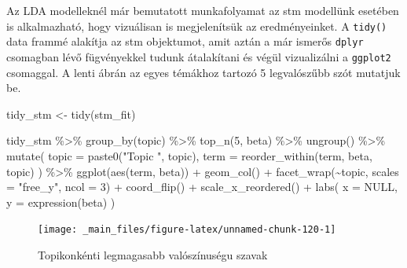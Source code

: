 \documentclass[
]{book}
\newenvironment{Shaded}{\begin{snugshade}}{\end{snugshade}}
\newcommand{\AttributeTok}[1]{\textcolor[rgb]{0.77,0.63,0.00}{#1}}
\newcommand{\ConstantTok}[1]{\textcolor[rgb]{0.00,0.00,0.00}{#1}}
\newcommand{\DecValTok}[1]{\textcolor[rgb]{0.00,0.00,0.81}{#1}}
\newcommand{\FunctionTok}[1]{\textcolor[rgb]{0.00,0.00,0.00}{#1}}
\newcommand{\NormalTok}[1]{#1}
\newcommand{\OtherTok}[1]{\textcolor[rgb]{0.56,0.35,0.01}{#1}}
\newcommand{\SpecialCharTok}[1]{\textcolor[rgb]{0.00,0.00,0.00}{#1}}
\newcommand{\StringTok}[1]{\textcolor[rgb]{0.31,0.60,0.02}{#1}}
\begin{document}
Az LDA modelleknél már bemutatott munkafolyamat az stm modellünk
esetében is alkalmazható, hogy vizuálisan is megjelenítsük az
eredményeinket. A \texttt{tidy()} data frammé alakítja az stm
objektumot, amit aztán a már ismerős \texttt{dplyr} csomagban lévő
fügvényekkel tudunk átalakítani és végül vizualizálni a \texttt{ggplot2}
csomaggal. A lenti ábrán az egyes témákhoz tartozó 5 legvalószűbb szót
mutatjuk be.

\begin{Shaded}
\begin{Highlighting}[]
\NormalTok{tidy\_stm }\OtherTok{\textless{}{-}} \FunctionTok{tidy}\NormalTok{(stm\_fit)}
\end{Highlighting}
\end{Shaded}

\begin{Shaded}
\begin{Highlighting}[]
\NormalTok{tidy\_stm }\SpecialCharTok{\%\textgreater{}\%}
  \FunctionTok{group\_by}\NormalTok{(topic) }\SpecialCharTok{\%\textgreater{}\%}
  \FunctionTok{top\_n}\NormalTok{(}\DecValTok{5}\NormalTok{, beta) }\SpecialCharTok{\%\textgreater{}\%}
  \FunctionTok{ungroup}\NormalTok{() }\SpecialCharTok{\%\textgreater{}\%}
  \FunctionTok{mutate}\NormalTok{(}
    \AttributeTok{topic =} \FunctionTok{paste0}\NormalTok{(}\StringTok{"Topic "}\NormalTok{, topic),}
    \AttributeTok{term =} \FunctionTok{reorder\_within}\NormalTok{(term, beta, topic)}
\NormalTok{  ) }\SpecialCharTok{\%\textgreater{}\%}
  \FunctionTok{ggplot}\NormalTok{(}\FunctionTok{aes}\NormalTok{(term, beta)) }\SpecialCharTok{+}
  \FunctionTok{geom\_col}\NormalTok{() }\SpecialCharTok{+}
  \FunctionTok{facet\_wrap}\NormalTok{(}\SpecialCharTok{\textasciitilde{}}\NormalTok{topic, }\AttributeTok{scales =} \StringTok{"free\_y"}\NormalTok{, }\AttributeTok{ncol =} \DecValTok{3}\NormalTok{) }\SpecialCharTok{+}
  \FunctionTok{coord\_flip}\NormalTok{() }\SpecialCharTok{+}
  \FunctionTok{scale\_x\_reordered}\NormalTok{() }\SpecialCharTok{+}
  \FunctionTok{labs}\NormalTok{(}
    \AttributeTok{x =} \ConstantTok{NULL}\NormalTok{,}
    \AttributeTok{y =} \FunctionTok{expression}\NormalTok{(beta)}
\NormalTok{  )}
\end{Highlighting}
\end{Shaded}

\begin{figure}

{\centering \texttt{[image: \_main\_files/figure-latex/unnamed-chunk-120-1]} 

}

\caption{Topikonkénti legmagasabb valószínuségu szavak}\label{fig:unnamed-chunk-120}
\end{figure}
\end{document}
